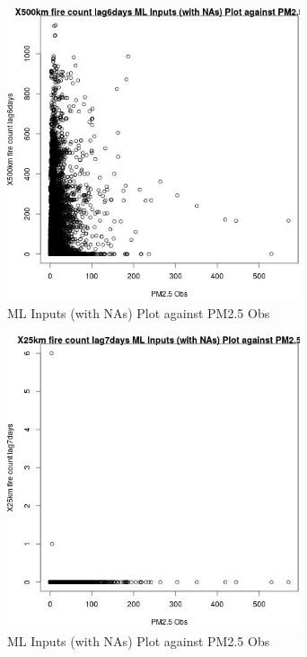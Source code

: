 \begin{figure} 
\centering  
\includegraphics[width=0.77\textwidth]{Code_Outputs/Report_ML_input_PM25_Step4_part_e_de_duplicated_aves_compiled_2019-05-14wNAs_X500km_fire_count_lag6daysvPM25_Obs.jpg} 
\caption{\label{fig:Report_ML_input_PM25_Step4_part_e_de_duplicated_aves_compiled_2019-05-14wNAsX500km_fire_count_lag6daysvPM25_Obs}ML Inputs (with NAs) Plot against PM2.5 Obs} 
\end{figure} 
 

\clearpage 

\begin{figure} 
\centering  
\includegraphics[width=0.77\textwidth]{Code_Outputs/Report_ML_input_PM25_Step4_part_e_de_duplicated_aves_compiled_2019-05-14wNAs_X25km_fire_count_lag7daysvPM25_Obs.jpg} 
\caption{\label{fig:Report_ML_input_PM25_Step4_part_e_de_duplicated_aves_compiled_2019-05-14wNAsX25km_fire_count_lag7daysvPM25_Obs}ML Inputs (with NAs) Plot against PM2.5 Obs} 
\end{figure} 
 

